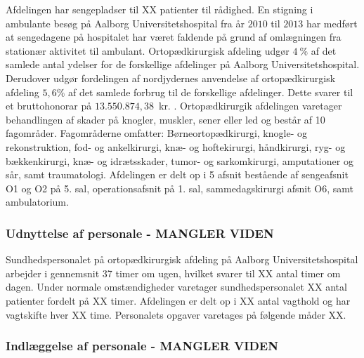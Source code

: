 Afdelingen har sengepladser til XX patienter til rådighed. En stigning i ambulante besøg på Aalborg Universitetshospital fra år $2010$ til $2013$ har medført at sengedagene på hospitalet har været faldende på grund af omlægningen fra stationær aktivitet til ambulant.
Ortopædkirurgisk afdeling udgør $4~\%$ af det samlede antal ydelser for de forskellige afdelinger på Aalborg Universitetshospital. Derudover udgør fordelingen af nordjydernes anvendelse af ortopædkirurgisk afdeling $5,6\%$ af det samlede forbrug til de forskellige afdelinger. Dette svarer til et bruttohonorar på $13.550.874,38$~kr. \cite{RegionNord2016}. Ortopædkirurgik afdelingen varetager behandlingen af skader på knogler, muskler, sener eller led og består af 10 fagområder. Fagområderne omfatter: Børneortopædkirurgi, knogle- og rekonstruktion, fod- og ankelkirurgi, knæ- og hoftekirurgi, håndkirurgi, ryg- og bækkenkirurgi, knæ- og idrætsskader, tumor- og sarkomkirurgi, amputationer og sår, samt traumatologi. Afdelingen er delt op i 5 afsnit bestående af sengeafsnit O1 og O2 på 5. sal, operationsafsnit på 1. sal, sammedagskirurgi afsnit O6, samt ambulatorium. \cite{Aalborg2016}


\subsubsection{Udnyttelse af personale - MANGLER VIDEN} 
Sundhedspersonalet på ortopædkirurgisk afdeling på Aalborg Universitetshospital arbejder i gennemsnit 37 timer om ugen, hvilket svarer til XX antal timer om dagen. \cite{Danske2015} Under normale omstændigheder varetager sundhedspersonalet XX antal patienter fordelt på XX timer. Afdelingen er delt op i XX antal vagthold og har vagtskifte hver XX time. Personalets opgaver varetages på følgende måder XX.

\subsubsection{Indlæggelse af personale - MANGLER VIDEN}

